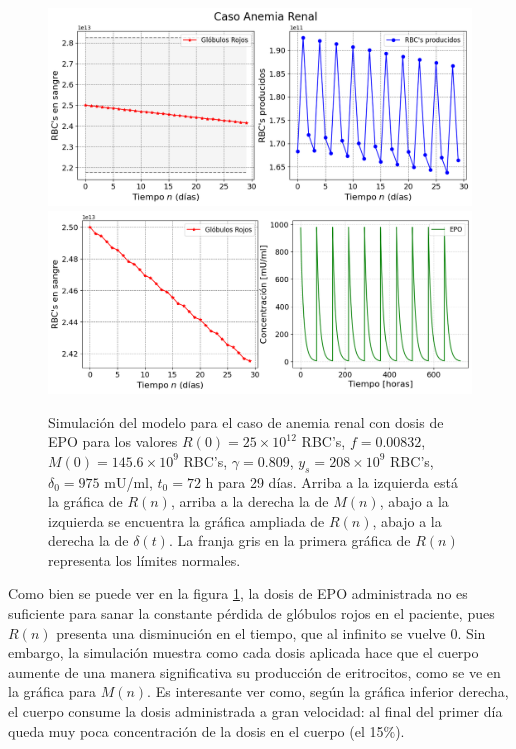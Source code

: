 \begin{figure}[H]
    \centering
    \captionsetup{justification=centering}
    \includegraphics[scale=0.526]{figures/AR11.png}
    \includegraphics[scale=0.526]{figures/AR12.png}
    \caption{Simulación del modelo para el caso de anemia renal con dosis de EPO para los valores $R(0)=25\times 10^{12}$ RBC's, $f=0.00832$, $M(0)=145.6\times 10^{9}$ RBC's, $\gamma = 0.809$, $y_s = 208\times10^{9}$ RBC's, $\delta_0 = 975$ mU/ml, $t_0 =72$ h para 29 días. Arriba a la izquierda está la gráfica de $R(n)$, arriba a la derecha la de $M(n)$, abajo a la izquierda se encuentra la gráfica ampliada de $R(n)$, abajo a la derecha la de $\delta(t)$. La franja gris en la primera gráfica de $R(n)$ representa los límites normales.}
    \label{sec:variaciones:fig:Anemia1}
\end{figure}

Como bien se puede ver en la figura \ref{sec:variaciones:fig:Anemia1}, la dosis de EPO administrada no es suficiente para sanar la constante pérdida de glóbulos rojos en el paciente, pues $R(n)$ presenta una disminución en el tiempo, que al infinito se vuelve 0. Sin embargo, la simulación muestra como cada dosis aplicada hace que el cuerpo aumente de una manera significativa su producción de eritrocitos, como se ve en la gráfica para $M(n)$. Es interesante ver como, según la gráfica inferior derecha, el cuerpo consume la dosis administrada a gran velocidad: al final del primer día queda muy poca concentración de la dosis en el cuerpo (el 15$\%$).

